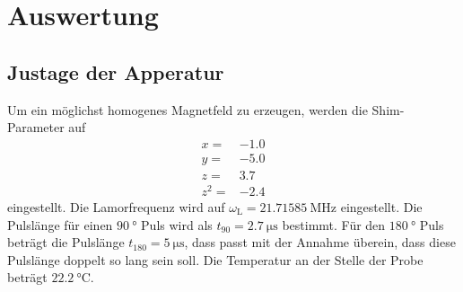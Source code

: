 \newpage
\section{Auswertung}
\label{sec:Auswertung}

\subsection{Justage der Apperatur}
Um ein möglichst homogenes Magnetfeld zu erzeugen, werden die Shim-Parameter auf 
\begin{align*}
  x =& \num{-1.0}\\
  y =& \num{-5.0}\\
  z =& \num{3.7}\\
  z^2 =& \num{-2.4}
\end{align*}
eingestellt.
Die Lamorfrequenz wird auf $\omega_{\text{L}} = \SI{21.71585}{\mega\hertz}$ eingestellt.
Die Pulslänge für einen $\SI{90}{\degree}$ Puls wird als $t_{\text{90}}=\SI{2.7}{\micro\second}$ bestimmt.
Für den $\SI{180}{\degree}$ Puls beträgt die Pulslänge $t_{\text{180}}=\SI{5}{\micro\second}$, dass passt mit der 
Annahme überein, dass diese Pulslänge doppelt so lang sein soll. Die Temperatur an der Stelle der Probe beträgt $\SI{22.2}{\celsius}$.

